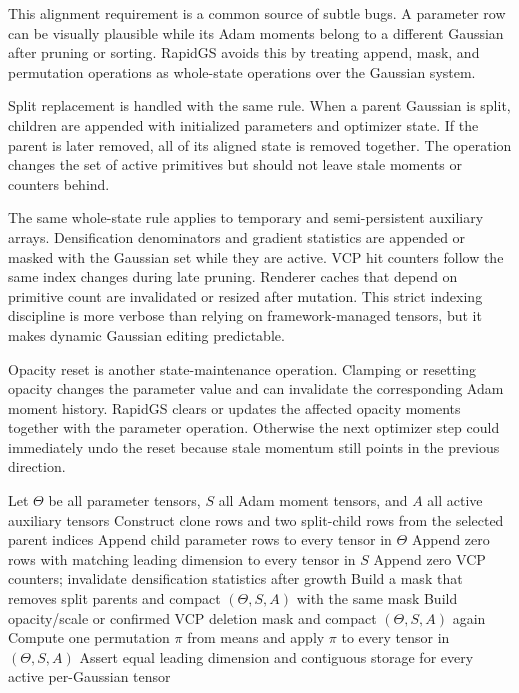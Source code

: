 This alignment requirement is a common source of subtle bugs. A parameter row can be visually plausible while its Adam moments belong to a different Gaussian after pruning or sorting. RapidGS avoids this by treating append, mask, and permutation operations as whole-state operations over the Gaussian system.

Split replacement is handled with the same rule. When a parent Gaussian is split, children are appended with initialized parameters and optimizer state. If the parent is later removed, all of its aligned state is removed together. The operation changes the set of active primitives but should not leave stale moments or counters behind.

The same whole-state rule applies to temporary and semi-persistent auxiliary arrays. Densification denominators and gradient statistics are appended or masked with the Gaussian set while they are active. VCP hit counters follow the same index changes during late pruning. Renderer caches that depend on primitive count are invalidated or resized after mutation. This strict indexing discipline is more verbose than relying on framework-managed tensors, but it makes dynamic Gaussian editing predictable.

Opacity reset is another state-maintenance operation. Clamping or resetting opacity changes the parameter value and can invalidate the corresponding Adam moment history. RapidGS clears or updates the affected opacity moments together with the parameter operation. Otherwise the next optimizer step could immediately undo the reset because stale momentum still points in the previous direction.

\begin{algorithm}[H]
\caption{Aligned mutation of dynamic Gaussian state}
\label{alg:aligned-mutation}
\begin{algorithmic}[1]
\STATE Let $\Theta$ be all parameter tensors, $S$ all Adam moment tensors, and $A$ all active auxiliary tensors
\STATE Construct clone rows and two split-child rows from the selected parent indices
\STATE Append child parameter rows to every tensor in $\Theta$
\STATE Append zero rows with matching leading dimension to every tensor in $S$
\STATE Append zero VCP counters; invalidate densification statistics after growth
\STATE Build a mask that removes split parents and compact $(\Theta,S,A)$ with the same mask
\STATE Build opacity/scale or confirmed VCP deletion mask and compact $(\Theta,S,A)$ again
  \STATE Compute one permutation $\pi$ from means and apply $\pi$ to every tensor in $(\Theta,S,A)$
\ENDIF
\STATE Assert equal leading dimension and contiguous storage for every active per-Gaussian tensor
\end{algorithmic}
\end{algorithm}

